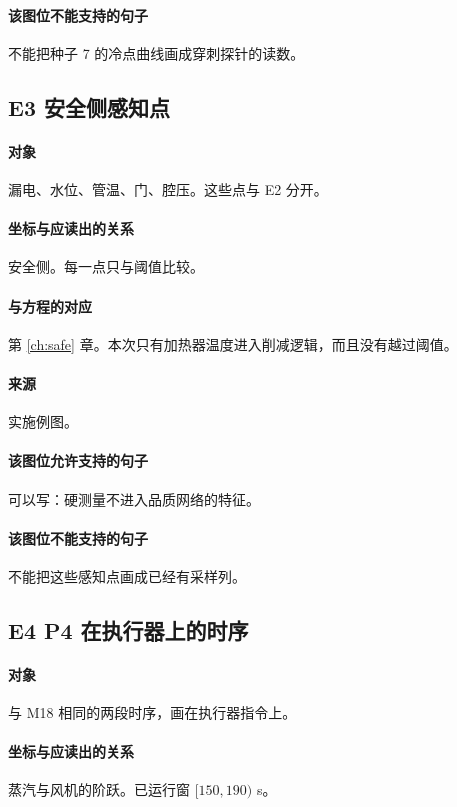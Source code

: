 \paragraph{该图位不能支持的句子}
不能把种子 7 的冷点曲线画成穿刺探针的读数。

\subsection{E3 安全侧感知点}
\paragraph{对象}
漏电、水位、管温、门、腔压。这些点与 E2 分开。

\paragraph{坐标与应读出的关系}
安全侧。每一点只与阈值比较。

\paragraph{与方程的对应}
第 \ref{ch:safe} 章。本次只有加热器温度进入削减逻辑，而且没有越过阈值。

\paragraph{来源}
实施例图。

\paragraph{该图位允许支持的句子}
可以写：硬测量不进入品质网络的特征。

\paragraph{该图位不能支持的句子}
不能把这些感知点画成已经有采样列。

\subsection{E4 P4 在执行器上的时序}
\paragraph{对象}
与 M18 相同的两段时序，画在执行器指令上。

\paragraph{坐标与应读出的关系}
蒸汽与风机的阶跃。已运行窗 $[150,190)$ s。

